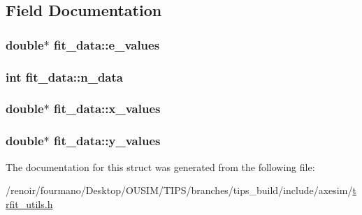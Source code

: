 \subsection{Field Documentation}
\hypertarget{structfit__data_aba48a3681410b47505650b02fbf12fc2}{
\subsubsection[{e\_\-values}]{\setlength{\rightskip}{0pt plus 5cm}double$\ast$ {\bf fit\_\-data::e\_\-values}}}
\label{structfit__data_aba48a3681410b47505650b02fbf12fc2}
\hypertarget{structfit__data_ae9f10db86844961dcd181100969c9165}{
\subsubsection[{n\_\-data}]{\setlength{\rightskip}{0pt plus 5cm}int {\bf fit\_\-data::n\_\-data}}}
\label{structfit__data_ae9f10db86844961dcd181100969c9165}
\hypertarget{structfit__data_a1c6e3ff09d22028544d999e46bb7c625}{
\subsubsection[{x\_\-values}]{\setlength{\rightskip}{0pt plus 5cm}double$\ast$ {\bf fit\_\-data::x\_\-values}}}
\label{structfit__data_a1c6e3ff09d22028544d999e46bb7c625}
\hypertarget{structfit__data_a7eb6386abb30ccac9cf332fada926fe3}{
\subsubsection[{y\_\-values}]{\setlength{\rightskip}{0pt plus 5cm}double$\ast$ {\bf fit\_\-data::y\_\-values}}}
\label{structfit__data_a7eb6386abb30ccac9cf332fada926fe3}


The documentation for this struct was generated from the following file:\begin{DoxyCompactItemize}
\item 
/renoir/fourmano/Desktop/OUSIM/TIPS/branches/tips\_\-build/include/axesim/\hyperlink{trfit__utils_8h}{trfit\_\-utils.h}\end{DoxyCompactItemize}

